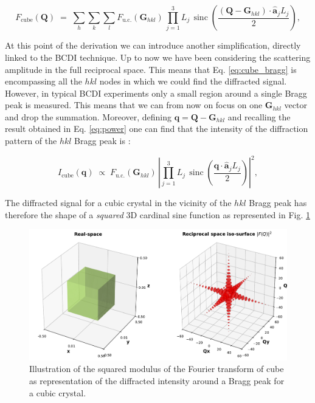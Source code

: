\begin{equation}
    F_{\text{cube}}(\mathbf Q) \;=\; 
    \sum_{h} \sum_{k} \sum_{l} F_{\text{u.c.}}(\mathbf{G}_{hkl})\,
    \prod_{j=1}^{3} L_j \,\!\operatorname{sinc}\left(\frac{(\mathbf{Q}- \mathbf{G}_{hkl}) \cdot \mathbf{\hat{a}}_j L_j}{2}\right),
    \label{eq:cube_bragg}
\end{equation}

At this point of the derivation we can introduce another simplification, directly linked to the BCDI technique.
Up to now we have been considering the scattering amplitude in the full reciprocal space. This means that Eq. \ref{eq:cube_bragg}
is encompassing all the $hkl$ nodes in which we could find the diffracted signal. However, in typical BCDI experiments 
only a small region around a single Bragg peak is measured. This means that we can from now on focus on one $\mathbf{G}_{hkl}$ 
vector and drop the summation.  Moreover, defining $\mathbf q = \mathbf{Q}- \mathbf{G}_{hkl}$ and recalling the result obtained in Eq. \ref{eq:power} 
one can find that the intensity of the diffraction pattern of the $hkl$ Bragg peak is : 

\begin{equation}
    I_{\text{cube}}(\mathbf q) \;\propto\; 
    F_{\text{u.c.}}(\mathbf{G}_{hkl})\,
    \left | \prod_{j=1}^{3} L_j \,\!\operatorname{sinc}\left(\frac{\mathbf{q} \cdot \mathbf{\hat{a}}_j L_j}{2}\right)\right|^2,
    \label{eq:cube_bragg2}
\end{equation}

The diffracted signal for a cubic crystal in the vicinity of the $hkl$ Bragg peak has therefore 
the shape of a \textit{squared} 3D cardinal sine function as represented in Fig. \ref{fig:cube}

\begin{figure}[H]
    \centering
    \includegraphics[width=\textwidth]{figures/Intro/cube1.pdf}
    \caption{Illustration of the squared modulus of the Fourier transform of cube as representation of the diffracted 
    intensity around a Bragg peak for a cubic crystal. }
    \label{fig:cube}
\end{figure}

